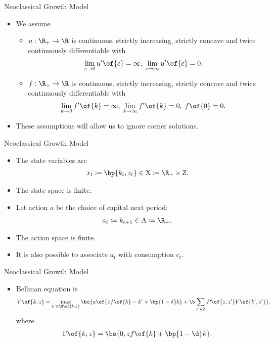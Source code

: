 \documentclass[11pt,xcolor={dvipsnames},aspectratio=159,hyperref={pdftex,pdfpagemode=UseNone,hidelinks,pdfdisplaydoctitle=true},usepdftitle=false]{beamer}
\begin{document}
\begin{frame}{Neoclassical Growth Model}   
    \begin{itemize}
       \item We assume \begin{itemize}
        \item $u: \R_+ \rightarrow \R$ is continuous, strictly increasing, strictly concave and twice continuously differentiable with \begin{align*} \lim_{c\rightarrow 0} u^\prime\of{c} = \infty, \; \lim_{c\rightarrow \infty} u^\prime\of{c} = 0. \end{align*}
        \item $f: \R_+ \rightarrow \R$ is continuous, strictly increasing, strictly concave and twice continuously differentiable with  \begin{align*} \lim_{k\rightarrow 0} f^\prime\of{k} = \infty, \; \lim_{k\rightarrow \infty} f^\prime\of{k} = 0, \; f\of{0} = 0. \end{align*}
       \end{itemize}
       \item These assumptions will allow us to ignore corner solutions.
   \end{itemize}
   \end{frame}
   

   \begin{frame}{Neoclassical Growth Model}   
    \begin{itemize}
       \item The state variables are \begin{align*}
           x_t \coloneq \bp{k_t, z_t} \in \text{X} \coloneq \R_+ \times \text{Z}.
       \end{align*}
    \item The state space is  finite.
    \item Let action $a$ be the choice of capital next period: \begin{align*}
        a_t \coloneq k_{t+1} \in \text{A} \coloneq \R_+.
    \end{align*}
    \item The action space is  finite.
    \item It is also possible to associate $a_t$ with consumption $c_t$.
   \end{itemize}
   \end{frame}

\begin{frame}{Neoclassical Growth Model}
    \begin{itemize}
        \item Bellman equation is \begin{align*}
            V\of{k,z} = \max_{k^\prime \in \G\of{k,z}} \bc{u\of{z f\of{k} - k^\prime + \bp{1-\delta}k} + \b \sum_{z^\prime \in \text{Z}} P\of{z,z^\prime} V\of{k^\prime,z^\prime} },
        \end{align*}
        where \begin{align*}\Gamma\of{k,z} =\bs{0,zf\of{k} + \bp{1-\d}k}.\end{align*}
    \end{itemize}
    \end{frame}
\end{document}
